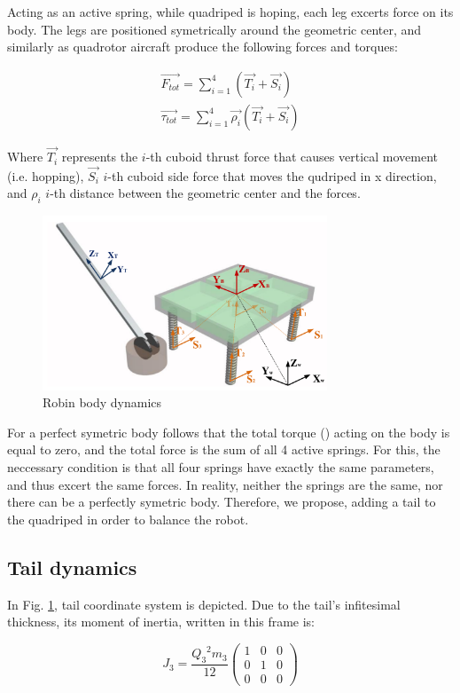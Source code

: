 Acting as an active spring, while quadriped is hoping, each leg excerts force on its body. The legs are positioned symetrically around the geometric center, and similarly as quadrotor aircraft produce the following forces and torques:

\begin{gather}\label{eq:Forces}
\vec{F_{tot}}=\sum_{i=1}^{4}(\vec{T_{i}}+\vec{S_{i}})\\
\vec{\tau_{tot}}=\sum_{i=1}^{4}\vec{\rho _i}(\vec{T_{i}}+\vec{S_{i}})
\end{gather}  

Where $\vec{T_{i}}$ represents the $i$-th cuboid thrust force that causes vertical movement (i.e. hopping), $\vec{S_{i}}$ $i$-th cuboid side force that moves the qudriped in x direction, and $\rho _i$ $i$-th distance between the geometric center and the forces.

\begin{figure}
	\centering
	\includegraphics[width=85mm]{./pictures/RobinMoment.pdf}
	\caption{Robin body dynamics}
	\label{fig:rmoment}
\end{figure}

For a perfect symetric body follows that the total torque (\label{eq:Forces}) acting on the body is equal to zero, and the total force is the sum of all 4 active springs. For this, the neccessary condition is that all four springs have exactly the same parameters, and thus excert the same forces. In reality, neither the springs are the same, nor there can be a perfectly symetric body. Therefore, we propose, adding a tail to the quadriped in order to balance the robot. 
\subsection{Tail dynamics}
In Fig. \ref{fig:rmoment}, tail coordinate system is depicted. Due to the tail's infitesimal thickness, its moment of inertia, written in this frame is:

\begin{equation}
J_3=\frac{{Q_3}^2 m_3}{12}\left(
\begin{array}{ccc}
 1 & 0 & 0 \\
 0 & 1 & 0 \\
 0 & 0 & 0
\end{array}
\right)
\end{equation} 


